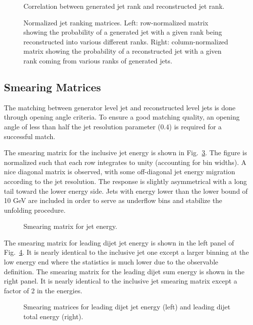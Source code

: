 \begin{figure}[htp!]
    \centering
    \caption{Correlation between generated jet rank and reconstructed jet rank.}
    \label{Figure:Unfolding-JetRankingCount}
\end{figure}

\begin{figure}[htp!]
    \centering
    \caption{Normalized jet ranking matrices.  Left: row-normalized matrix showing the probability of a generated jet with a given rank being reconstructed into various different ranks.  Right: column-normalized matrix showing the probability of a reconstructed jet with a given rank coming from various ranks of generated jets.}
    \label{Figure:Unfolding-JetRankingPercentage}
\end{figure}


\subsection{Smearing Matrices}

The matching between generator level jet and reconstructed level jets is done through opening angle criteria.  To ensure a good matching quality, an opening angle of less than half the jet resolution parameter (0.4) is required for a successful match.

The smearing matrix for the inclusive jet energy is shown in Fig.~\ref{Figure:Unfolding-SmearingMatrixE}.  The figure is normalized such that each row integrates to unity (accounting for bin widths).  A nice diagonal matrix is observed, with some off-diagonal jet energy migration according to the jet resolution.  The response is slightly asymmetrical with a long tail toward the lower energy side.  Jets with energy lower than the lower bound of 10 GeV are included in order to serve as underflow bins and stabilize the unfolding procedure.
%
\begin{figure}[htp!]
    \centering
    \caption{Smearing matrix for jet energy.}
    \label{Figure:Unfolding-SmearingMatrixE}
\end{figure}

The smearing matrix for leading dijet jet energy is shown in the left panel of Fig.~\ref{Figure:Unfolding-SmearingMatrixLeadingDiJet}.  It is nearly identical to the inclusive jet one except a larger binning at the low energy end where the statistics is much lower due to the observable definition.  The smearing matrix for the leading dijet sum energy is shown in the right panel.  It is nearly identical to the inclusive jet smearing matrix except a factor of 2 in the energies.
%
\begin{figure}[htp!]
    \centering
    \caption{Smearing matrices for leading dijet jet energy (left) and leading dijet total energy (right).}
    \label{Figure:Unfolding-SmearingMatrixLeadingDiJet}
\end{figure}

